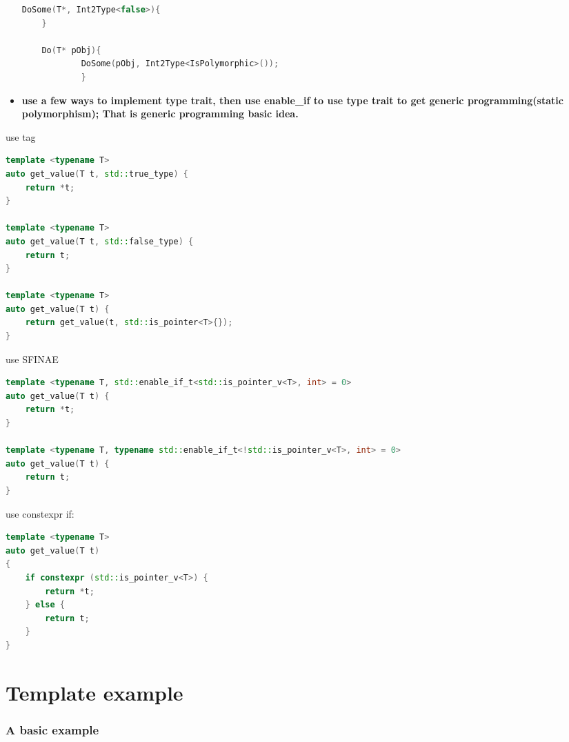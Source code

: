 \documentclass[a4paper,12pt,twoside]{book}
\begin{document}
\begin{itemize}
\begin{lstlisting}[frame=single, language=c++]
DoSome(T*, Int2Type<false>){
	}
	
	Do(T* pObj){
			DoSome(pObj, Int2Type<IsPolymorphic>());
			}

\end{lstlisting}	

\item \textbf{use a few ways to implement type trait, then use enable\_if to use type trait to get generic programming(static polymorphism); That is generic programming basic idea.}
\end{itemize}


use tag
	\begin{lstlisting}[frame=single, language=c++]
template <typename T>
auto get_value(T t, std::true_type) {
    return *t;
}

template <typename T>
auto get_value(T t, std::false_type) {
    return t;
}

template <typename T>
auto get_value(T t) {
    return get_value(t, std::is_pointer<T>{}); 
}
\end{lstlisting}
use SFINAE 

	\begin{lstlisting}[frame=single, language=c++]
template <typename T, std::enable_if_t<std::is_pointer_v<T>, int> = 0>
auto get_value(T t) {
    return *t;
}

template <typename T, typename std::enable_if_t<!std::is_pointer_v<T>, int> = 0>
auto get_value(T t) {
    return t;
}
\end{lstlisting}
use constexpr if: 

	\begin{lstlisting}[frame=single, language=c++]
template <typename T>
auto get_value(T t)
{
    if constexpr (std::is_pointer_v<T>) {
        return *t;
    } else {
        return t;
    }
}
\end{lstlisting}


\section{Template example}

\subsubsection{A basic example}
\end{document}
